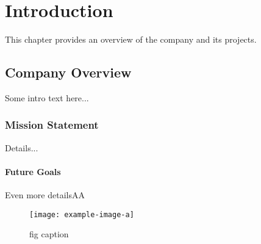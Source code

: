 \chapter{Introduction}
This chapter provides an overview of the company and its projects.
\lipsum[2-2]

\section{Company Overview}
Some intro text here...

\subsection{Mission Statement}
Details...

\subsubsection{Future Goals}
Even more detailsAA


\begin{figure}[h]
\texttt{[image: example-image-a]}
\caption[]{fig caption}\label{fig:example}
    \end{figure}
